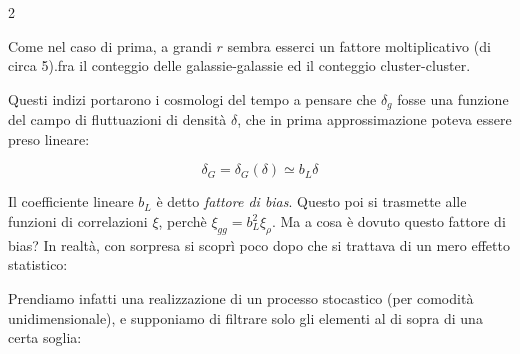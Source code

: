 \documentclass{report}
\begin{document}
\begin{enumerate}
\begin{multicols}{2}

    \columnbreak

    Come nel caso di prima, a grandi $r$ sembra esserci un fattore moltiplicativo (di circa 5).fra il conteggio delle galassie-galassie ed il conteggio cluster-cluster. 
    \end{multicols}

    \end{enumerate}

    Questi indizi portarono i cosmologi del tempo a pensare che $\delta_g$ fosse una funzione del campo di fluttuazioni di densità $\delta$, che in prima approssimazione poteva essere preso lineare: 

    \begin{equation}
        \delta_G = \delta_G(\delta) \simeq b_L \delta
    \end{equation}

    Il coefficiente lineare $b_L$ è detto \emph{fattore di bias}. Questo poi si trasmette alle funzioni di correlazioni $\xi$, perchè $\xi_{gg} = b_L^2\xi_\rho$. Ma a cosa è dovuto questo fattore di bias? In realtà, con sorpresa si scoprì poco dopo che si trattava di un mero effetto statistico: 

    Prendiamo infatti una realizzazione di un processo stocastico (per comodità unidimensionale), e supponiamo di filtrare solo gli elementi al di sopra di una certa soglia: 
\end{document}
